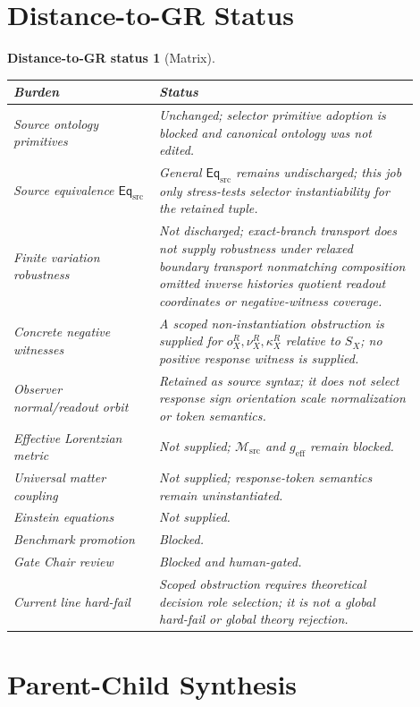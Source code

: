 \documentclass[11pt]{article}
\newcommand{\EqSrc}{\mathsf{Eq}_{\mathrm{src}}}
\newcommand{\Msrc}{\mathcal{M}_{\mathrm{src}}}
\newcommand{\geff}{g_{\mathrm{eff}}}
\newtheorem{distancestatus}{Distance-to-GR status}
\begin{document}
\section{Distance-to-GR Status}

\begin{distancestatus}[Matrix]
\begin{center}
\small
\begin{tabular}{p{0.32\linewidth}p{0.58\linewidth}}
\hline
\textbf{Burden} & \textbf{Status} \\
\hline
Source ontology primitives & Unchanged; selector primitive adoption is blocked and canonical ontology was not edited. \\
Source equivalence \(\EqSrc\) & General \(\EqSrc\) remains undischarged; this job only stress-tests selector instantiability for the retained tuple. \\
Finite variation robustness & Not discharged; exact-branch transport does not supply robustness under relaxed boundary transport nonmatching composition omitted inverse histories quotient readout coordinates or negative-witness coverage. \\
Concrete negative witnesses & A scoped non-instantiation obstruction is supplied for \(o^R_X,\nu^R_X,\kappa^R_X\) relative to \(S_X\); no positive response witness is supplied. \\
Observer normal/readout orbit & Retained as source syntax; it does not select response sign orientation scale normalization or token semantics. \\
Effective Lorentzian metric & Not supplied; \(\Msrc\) and \(\geff\) remain blocked. \\
Universal matter coupling & Not supplied; response-token semantics remain uninstantiated. \\
Einstein equations & Not supplied. \\
Benchmark promotion & Blocked. \\
Gate Chair review & Blocked and human-gated. \\
Current line hard-fail & Scoped obstruction requires theoretical decision role selection; it is not a global hard-fail or global theory rejection. \\
\hline
\end{tabular}
\end{center}
\end{distancestatus}

\section{Parent-Child Synthesis}
\end{document}
